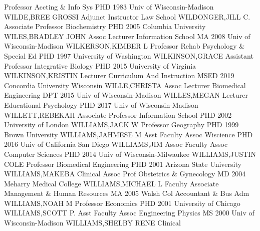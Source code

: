 \documentclass[
]{article}
\begin{document}
\textbar{}  \textbar Professor \textbar Accting \& Info Sys
\textbar PHD 1983 Univ of Wisconsin-Madison \textbar WILDE,BREE GROSSI
\textbar{}  \textbar Adjunct Instructor \textbar Law School
\textbar WILDONGER,JILL C. \textbar Associate Professor \textbar{}
 \textbar Biochemistry \textbar PHD 2005 Columbia University
\textbar WILES,BRADLEY JOHN \textbar Assoc Lecturer \textbar{}
 \textbar Information School \textbar MA 2008 Univ of
Wisconsin-Madison \textbar WILKERSON,KIMBER L \textbar Professor
\textbar{}  \textbar Rehab Psychology \& Special Ed
\textbar PHD 1997 University of Washington \textbar WILKINSON,GRACE
\textbar Assistant Professor \textbar{} 
\textbar Integrative Biology \textbar PHD 2015 University of Virginia
\textbar WILKINSON,KRISTIN \textbar Lecturer \textbar{} 
\textbar Curriculum And Instruction \textbar MSED 2019 Concordia
University Wisconsin \textbar WILLE,CHRISTA \textbar Assoc Lecturer
\textbar{}  \textbar Biomedical Engineering \textbar DPT
2015 Univ of Wisconsin-Madison \textbar WILLES,MEGAN \textbar Lecturer
\textbar{}  \textbar Educational Psychology \textbar PHD
2017 Univ of Wisconsin-Madison \textbar WILLETT,REBEKAH
\textbar Associate Professor \textbar{} 
\textbar Information School \textbar PHD 2002 University of London
\textbar WILLIAMS,JACK W \textbar Professor \textbar{} 
\textbar Geography \textbar PHD 1999 Brown University
\textbar WILLIAMS,JAHMESE M \textbar Asst Faculty Assoc \textbar{}
 \textbar Wiscience \textbar PHD 2016 Univ of California San
Diego \textbar WILLIAMS,JIM \textbar Assoc Faculty Assoc \textbar{}
 \textbar Computer Sciences \textbar PHD 2014 Univ of
Wisconsin-Milwaukee \textbar WILLIAMS,JUSTIN COLE \textbar Professor
\textbar{}  \textbar Biomedical Engineering \textbar PHD
2001 Arizona State University \textbar WILLIAMS,MAKEBA \textbar Clinical
Assoc Prof \textbar{}  \textbar Obstetrics \& Gynecology
\textbar MD 2004 Meharry Medical College \textbar WILLIAMS,MICHAEL L
\textbar Faculty Associate \textbar{}  \textbar Management
\& Human Resources \textbar MA 2005 Walsh Col Accountant \& Bus Adm
\textbar WILLIAMS,NOAH M \textbar Professor \textbar{} 
\textbar Economics \textbar PHD 2001 University of Chicago
\textbar WILLIAMS,SCOTT P. \textbar Asst Faculty Assoc \textbar{}
 \textbar Engineering Physics \textbar MS 2000 Univ of
Wisconsin-Madison \textbar WILLIAMS,SHELBY RENE \textbar Clinical
\end{document}
